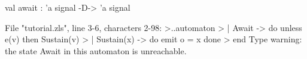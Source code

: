 \chklistingtrue
{}
\begin{ChkListingMsg}
val await : 'a signal -D-> 'a signal
\end{ChkListingMsg}
\begin{ChkListingErr}
File "tutorial.zls", line 3-6, characters 2-98:
>..automaton
>  | Await -> do unless e(v) then Sustain(v)
>  | Sustain(x) -> do emit o = x done
>  end
Type warning: the state Await in this automaton is unreachable.
\end{ChkListingErr}
